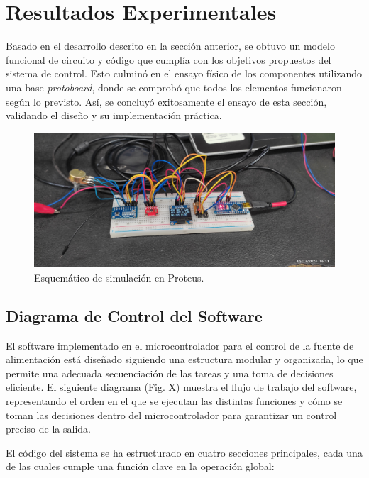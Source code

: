 \section{Resultados Experimentales}
Basado en el desarrollo descrito en la sección anterior, se obtuvo un modelo funcional de circuito y código que cumplía con los objetivos propuestos del sistema de control. Esto culminó en el ensayo físico de los componentes utilizando una base \textit{protoboard}, donde se comprobó que todos los elementos funcionaron según lo previsto. Así, se concluyó exitosamente el ensayo de esta sección, validando el diseño y su implementación práctica.
\begin{figure}[H]
    \centering
    \includegraphics[scale=0.08]{./imagenes/ensayo_digital.jpg}
    \caption{Esquemático de simulación en Proteus.}
    \label{F:esquematico_proteus}
\end{figure}

\subsection{Diagrama de Control del Software}

El software implementado en el microcontrolador para el control de la fuente de alimentación está diseñado siguiendo una estructura modular y organizada, lo que permite una adecuada secuenciación de las tareas y una toma de decisiones eficiente. El siguiente diagrama (Fig. X) muestra el flujo de trabajo del software, representando el orden en el que se ejecutan las distintas funciones y cómo se toman las decisiones dentro del microcontrolador para garantizar un control preciso de la salida.

El código del sistema se ha estructurado en cuatro secciones principales, cada una de las cuales cumple una función clave en la operación global:

